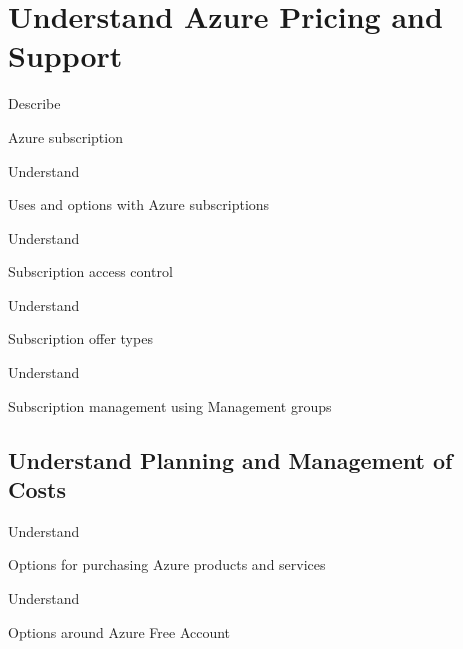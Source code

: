 \documentclass{scrartcl}
\newenvironment{flashcard}[2][]{%
    #1
    \vfill
    \centerline{\Large{#2}}
    \vfill
    \newpage
}
{\newpage}
\newcommand{\sectioncard}[1]{
    \vspace*{\stretch{1}}
    \section{#1}
    \vspace*{\stretch{1}}
    \pagebreak
}
\newcommand{\subsectioncard}[1]{
    \vspace*{\stretch{1}}
    \subsection{#1}
    \vspace*{\stretch{1}}
    \pagebreak
}
\begin{document}
    \sectioncard{Understand Azure Pricing and Support}

    \begin{flashcard}[Describe]{Azure subscription}

    \end{flashcard}

    \begin{flashcard}[Understand]{Uses and options with Azure subscriptions}

    \end{flashcard}

    \begin{flashcard}[Understand]{Subscription access control}

    \end{flashcard}

    \begin{flashcard}[Understand]{Subscription offer types}

    \end{flashcard}

    \begin{flashcard}[Understand]{Subscription management using Management groups}

    \end{flashcard}

    \subsectioncard{Understand Planning and Management of Costs}

    \begin{flashcard}[Understand]{Options for purchasing Azure products and services}

    \end{flashcard}

    \begin{flashcard}[Understand]{Options around Azure Free Account}

    \end{flashcard}
\end{document}
